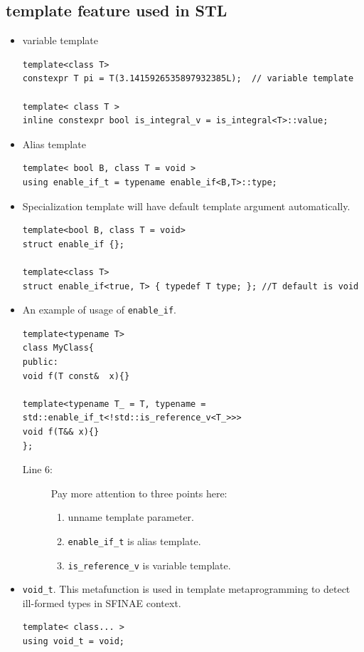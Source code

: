 \documentclass[a4paper,11pt,twoside]{book}
\begin{document}
\subsection{template feature used in STL}
\begin{itemize}
	\item variable template
\begin{lstlisting}[]
template<class T>
constexpr T pi = T(3.1415926535897932385L);  // variable template	

template< class T >
inline constexpr bool is_integral_v = is_integral<T>::value;
\end{lstlisting}

	\item Alias template
\begin{lstlisting}[]
template< bool B, class T = void >
using enable_if_t = typename enable_if<B,T>::type;
\end{lstlisting}
	
	\item Specialization template will have default template argument automatically.
\begin{lstlisting}[numbers=none]
template<bool B, class T = void>
struct enable_if {};

template<class T>
struct enable_if<true, T> { typedef T type; }; //T default is void
\end{lstlisting}

\item An example of usage of \texttt{enable\_if}.
\begin{lstlisting}
template<typename T>
class MyClass{
public:
void f(T const&  x){}
    
template<typename T_ = T, typename = std::enable_if_t<!std::is_reference_v<T_>>>
void f(T&& x){}
};
\end{lstlisting}
\begin{description}
    \item[Line 6:] Pay more attention to three points here:
        \begin{enumerate}
            \item unname template parameter.
            \item \texttt{enable\_if\_t} is alias template.
            \item \texttt{is\_reference\_v} is variable template.
        \end{enumerate}
\end{description}

    \item \texttt{void\_t}. This metafunction is used in template metaprogramming to detect ill-formed types in SFINAE context.
\begin{lstlisting}
template< class... >
using void_t = void;


\end{lstlisting}
\end{itemize}
\end{document}
